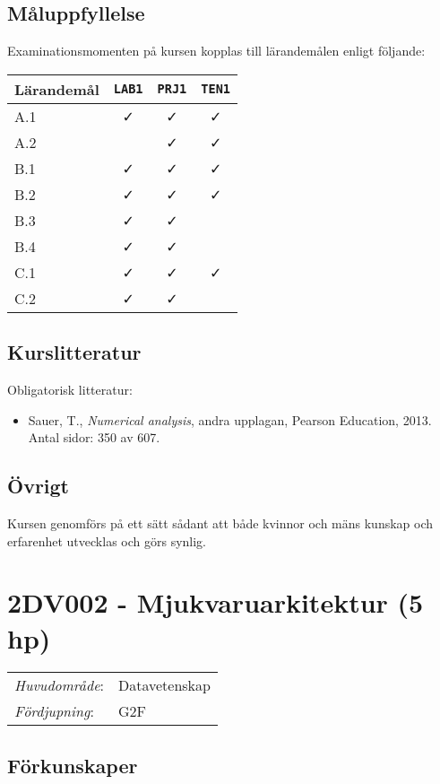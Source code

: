 \subsection*{Måluppfyllelse}

Examinationsmomenten på kursen kopplas till lärandemålen enligt
följande:

\begin{longtable}[]{@{}lccc@{}}
\toprule
\textsf{Lärandemål} & \texttt{LAB1} & \texttt{PRJ1} & \texttt{TEN1}\tabularnewline
\midrule
\endhead
A.1 & \faCheck & \faCheck & \faCheck\tabularnewline
A.2 & & \faCheck & \faCheck\tabularnewline
B.1 & \faCheck & \faCheck & \faCheck\tabularnewline
B.2 & \faCheck & \faCheck & \faCheck\tabularnewline
B.3 & \faCheck & \faCheck &\tabularnewline
B.4 & \faCheck & \faCheck &\tabularnewline
C.1 & \faCheck & \faCheck & \faCheck\tabularnewline
C.2 & \faCheck & \faCheck &\tabularnewline
\bottomrule
\end{longtable}

\subsection*{Kurslitteratur}

Obligatorisk litteratur:

\begin{itemize}
\tightlist
\item
  Sauer, T., \emph{Numerical analysis}, andra upplagan, Pearson
  Education, 2013. Antal sidor: 350 av 607.
\end{itemize}

\subsection*{Övrigt}

Kursen genomförs på ett sätt sådant att både kvinnor och mäns kunskap och erfarenhet utvecklas och görs synlig.
\pagebreak
\section*{2DV002 - Mjukvaruarkitektur (5 hp)}

\begin{tabular}{ll}\emph{Huvudområde}: & Datavetenskap\tabularnewline\emph{Fördjupning}: & G2F\tabularnewline\end{tabular}

\subsection*{Förkunskaper}


